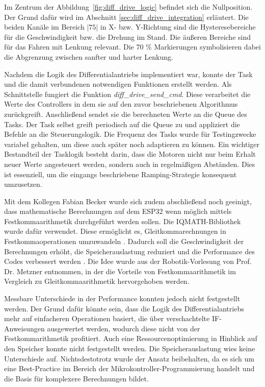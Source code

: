 Im Zentrum der Abbildung~\ref{fig:diff_drive_logic} befindet sich die Nullposition. Der Grund dafür wird im Abschnitt \ref{sec:diff_drive_integration} erläutert. Die beiden Kanäle im Bereich $|75|$ in X- bzw. Y-Richtung sind die Hysteresebereiche für die Geschwindigkeit bzw. die Drehung im Stand. Die äußeren Bereiche sind für das Fahren mit Lenkung relevant. Die 70 \% Markierungen symbolisieren dabei die Abgrenzung zwischen sanfter und harter Lenkung.

Nachdem die Logik des Differentialantriebs implementiert war, konnte der Task und die damit verbundenen notwendigen Funktionen erstellt werden. Als Schnittstelle fungiert die Funktion \textit{diff\_drive\_send\_cmd}. Diese verarbeitet die Werte des Controllers in dem sie auf den zuvor beschriebenen Algorithmus zurückgreift. Anschließend sendet sie die berechneten Werte an die Queue des Tasks. Der Task selbst greift periodisch auf die Queue zu und appliziert die Befehle an die Steuerungslogik. Die Frequenz des Tasks wurde für Testingzwecke variabel gehalten, um diese auch später noch adaptieren zu können. Ein wichtiger Bestandteil der Tasklogik besteht darin, dass die Motoren nicht nur beim Erhalt neuer Werte angesteuert werden, sondern auch in regelmäßigen Abständen. Dies ist essenziell, um die eingangs beschriebene Ramping-Strategie konsequent umzusetzen. \newline

Mit dem Kollegen Fabian Becker wurde sich zudem abschließend noch geeinigt, dass mathematische Berechnungen auf dem ESP32 wenn möglich mittels Festkommaarithmetik durchgeführt werden sollen. Die IQMATH-Bibliothek wurde dafür verwendet. Diese ermöglicht es, Gleitkommarechnungen in Festkommaoperationen umzuwandeln \cite{esp32_iqmath}. Dadurch soll die Geschwindigkeit der Berechnungen erhöht, die Speicherauslastung reduziert und die Performance des Codes verbessert werden \cite{esp32_iqmath}. Die Idee wurde aus der Robotik-Vorlesung von Prof. Dr. Metzner entnommen, in der die Vorteile von Festkommaarithmetik im Vergleich zu Gleitkommaarithmetik hervorgehoben werden. \newline

Messbare Unterschiede in der Performance konnten jedoch nicht festgestellt werden. Der Grund dafür könnte sein, dass die Logik des Differentialantriebs mehr auf einfacheren Operationen basiert, die über verschachtelte IF-Anweisungen ausgewertet werden, wodurch diese nicht von der Festkommarithmetik profitiert. Auch eine Ressourcenoptimierung in Hinblick auf den Speicher konnte nicht festgestellt werden. Die Speicherauslastung wies keine Unterschiede auf. Nichtsdestotrotz wurde der Ansatz beibehalten, da es sich um eine Best-Practice im Bereich der Mikrokontroller-Programmierung handelt und die Basis für komplexere Berechnungen bildet. \newline

